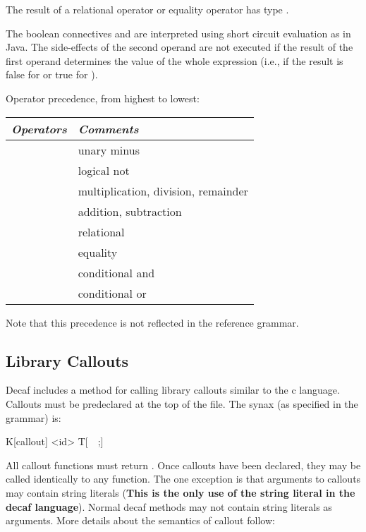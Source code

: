 The result of a relational operator or equality operator has type
.

The boolean connectives \term{\&\&} and \term{||} are interpreted using
short circuit evaluation as in Java.  The side-effects of the second
operand are not executed if the result of the first operand determines
the value of the whole expression (i.e., if the result is false for
\term{\&\&} or true for \term{||}).

Operator precedence, from highest to lowest:

\begin{center}
\begin{tabular}{|c|l|}
\hline
{\em Operators\/}  & {\em Comments\/} \\
\hline
\term{-}              & unary minus \\
\term{!}              & logical not \\
\term{* / \%}         & multiplication, division, remainder \\
\term{+ -}            & addition, subtraction \\
\term{<  <=   >=  >}  & relational \\
\term{==  !=}         &  equality \\
\term{\&\&}           & conditional and \\
\term{||}             & conditional or \\ \hline
\end{tabular}
\end{center}

Note that this precedence is not reflected in the reference grammar.

\subsection*{Library Callouts}

Decaf includes a method for calling library callouts similar to the c language. Callouts must be predeclared at the top
of the file. The synax (as specified in the grammar) is:

{\bnf  K[callout] <id> T[~~;] }

All callout functions must return . Once callouts have been declared, they may be called identically to any
function. The one exception is that arguments to callouts may contain string literals (\textbf{This is the only use of
the string literal in the decaf language}). Normal decaf methods may not contain string literals as arguments. More
details about the semantics of callout follow:

